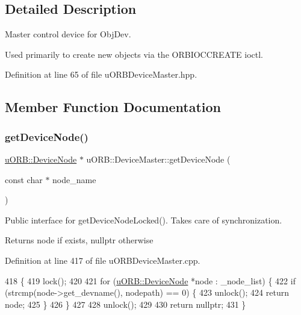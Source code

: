 \subsection{Detailed Description}
Master control device for Obj\+Dev.

Used primarily to create new objects via the O\+R\+B\+I\+O\+C\+C\+R\+E\+A\+TE ioctl. 

Definition at line 65 of file u\+O\+R\+B\+Device\+Master.\+hpp.



\subsection{Member Function Documentation}
\mbox{\label{classuORB_1_1DeviceMaster_a793df66a48dcabdd0f5bd8c85beee13c}} 
\subsubsection{\texorpdfstring{get\+Device\+Node()}{getDeviceNode()}}
{\footnotesize\ttfamily \hyperlink{classuORB_1_1DeviceNode}{u\+O\+R\+B\+::\+Device\+Node} $\ast$ u\+O\+R\+B\+::\+Device\+Master\+::get\+Device\+Node (\begin{DoxyParamCaption}\item[{const char $\ast$}]{node\+\_\+name }\end{DoxyParamCaption})}

Public interface for get\+Device\+Node\+Locked(). Takes care of synchronization. \begin{DoxyReturn}{Returns}
node if exists, nullptr otherwise 
\end{DoxyReturn}


Definition at line 417 of file u\+O\+R\+B\+Device\+Master.\+cpp.


\begin{DoxyCode}
418 \{
419     lock();
420 
421     \textcolor{keywordflow}{for} (\hyperlink{classuORB_1_1DeviceNode}{uORB::DeviceNode} *node : \_node\_list) \{
422         \textcolor{keywordflow}{if} (strcmp(node->get\_devname(), nodepath) == 0) \{
423             unlock();
424             \textcolor{keywordflow}{return} node;
425         \}
426     \}
427 
428     unlock();
429 
430     \textcolor{keywordflow}{return} \textcolor{keyword}{nullptr};
431 \}
\end{DoxyCode}
\mbox{\label{classuORB_1_1DeviceMaster_a0a8af69f5ba05738eb173a116acd8daf}} 

